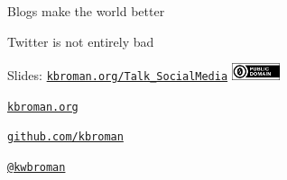 \documentclass[12pt,t,aspectratio=169]{beamer}
\begin{document}
{

\begin{frame}[c]{}

\centerline{
\color{background}
  \Large Blogs make the world better
}


\end{frame}
}





{

\begin{frame}[c]{}

\centerline{
\color{background}
  \Large Twitter is not entirely bad
}


\end{frame}
}







\begin{frame}[c]{}


\Large

Slides: \href{https://kbroman.org/Talk_SocialMedia}{\tt kbroman.org/Talk\_SocialMedia} \quad
\includegraphics[height=5mm]{Figs/cc-zero.png}


\vspace{7mm}

\href{https://kbroman.org}{\tt \lolit kbroman.org}

\vspace{7mm}

\href{https://github.com/kbroman}{\tt \lolit github.com/kbroman}

\vspace{7mm}

\href{https://twitter.com/kwbroman}{\tt \lolit @kwbroman}


\end{frame}
\end{document}
